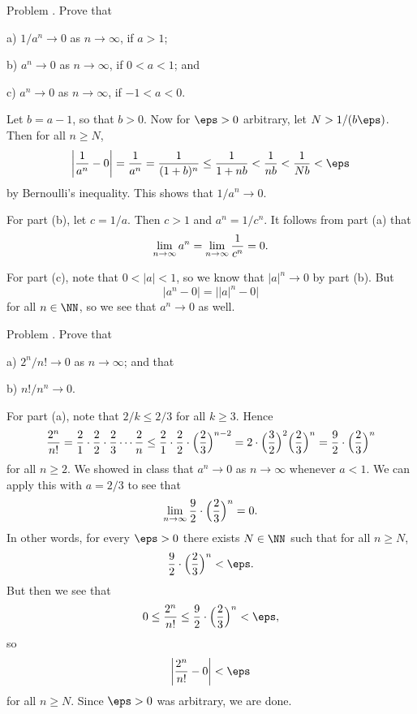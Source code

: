 


\def\To{\Rightarrow}



\bigskip

\proclaim Problem \advthm. Prove that
\medskip
\item{a)} $1/a^n\to 0$ as $n\to \infty$, if $a>1$;
\smallskip
\item{b)} $a^n\to 0$ as $n\to \infty$, if $0<a<1$; and
\smallskip
\item{c)} $a^n \to 0$ as $n\to \infty$, if $-1<a<0$.
\medskip

\proof Let $b = a-1$, so that $b>0$. Now for $\eps > 0$ arbitrary, let $N > {1/(b\eps)}$.
Then for all $n\ge N$,
$$ \biggl| {1\over a^n} - 0\biggr| = {1\over a^n} = {1\over (1+b)^n}
\le {1\over 1+nb} < {1\over nb} < {1\over Nb} < \eps$$
by Bernoulli's inequality. This shows that $1/a^n\to 0$.

For part (b), let $c = 1/a$. Then $c>1$ and $a^n = 1/c^n$. It follows from part (a) that
$$\lim_{n\to\infty} a^n = \lim_{n\to\infty} {1\over c^n} = 0.$$

For part (c), note that $0<|a|<1$, so we know that $|a|^n\to 0$ by part (b). But
$$|a^n - 0| = \bigl| |a|^n - 0 \bigr|$$
for all $n\in \NN$, so we see that $a^n\to 0$ as well.\slug

\proclaim Problem \advthm. Prove that
\medskip
\item{a)} $2^n / n! \to 0$ as $n\to \infty$; and that
\smallskip
\item{b)} $n!/n^n \to 0$.
\medskip

\proof For part (a), note that $2/k \le 2/3$ for all $k\ge 3$. Hence
$$ {2^n\over n!} = {2\over 1}\cdot {2\over 2}\cdot {2\over 3} \cdots {2\over n}
\le {2\over 1}\cdot {2\over 2} \cdot \Bigl( {2\over 3}\Bigr)^{n-2}
= 2\cdot \Bigl({3\over 2}\Bigr)^2 \Bigl( {2\over 3}\Bigr)^n
= {9\over 2} \cdot \Bigl( {2\over 3}\Bigr)^n$$
for all $n\ge 2$. We showed in class that $a^n \to 0$ as $n\to \infty$ whenever
$a < 1$. We can apply this with $a = 2/3$ to see that
$$\lim_{n\to \infty} {9\over 2} \cdot \Bigl( {2\over 3}\Bigr)^n = 0.$$
In other words, for every $\eps > 0$ there exists $N\in \NN$ such that for all $n\ge N$,
$${9\over 2} \cdot \Bigl( {2\over 3}\Bigr)^n < \eps.$$
But then we see that
$$0\le {2^n\over n!} \le {9\over 2} \cdot \Bigl( {2\over 3}\Bigr)^n < \eps,$$
so
$$\biggl| {2^n\over n!} - 0\biggr| <\eps$$
for all $n\ge N$. Since $\eps > 0$ was arbitrary, we are done.

